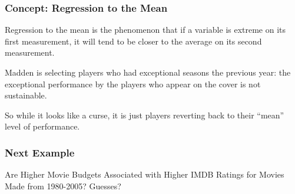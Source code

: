 \documentclass[handout]{beamer}
\newcommand{\blue}[1]{\textcolor{blue2}{#1}}
\begin{document}
\begin{frame}[fragile]
\frametitle{Concept: Regression to the Mean}

%
%
\blue{Regression to the mean} is the phenomenon that if a variable is extreme on its first measurement, it will tend to be closer to the average on its second measurement.
\vspace{0.5cm}

\pause Madden is selecting players who had \blue{exceptional} seasons the previous year: the exceptional performance by the players who appear on the cover is \blue{not sustainable}.  

\vspace{0.5cm}

\pause So while it looks like a curse, it is just players reverting back to their ``mean'' level of performance.  

\end{frame}


\begin{frame}[fragile]
\frametitle{Next Example}
Are Higher Movie Budgets Associated with Higher IMDB Ratings for Movies Made from 1980-2005?  Guesses?

\end{frame}



%
%
%
%
%
\end{document}
